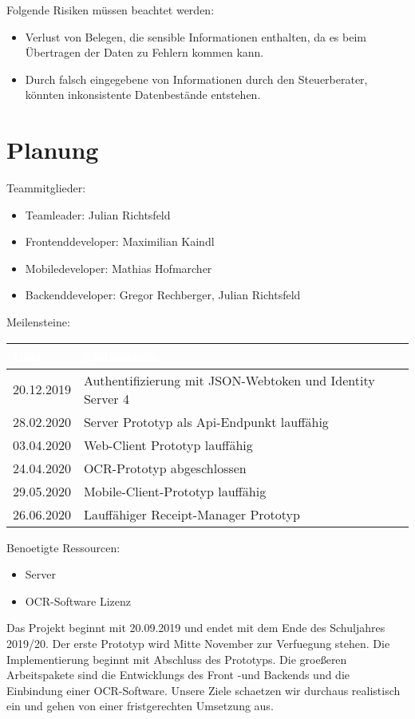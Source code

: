 \documentclass[12pt]{article}
\theoremstyle{definition}
\begin{document}
\begin{itemize}
\end{itemize}
Folgende Risiken müssen beachtet werden:

\begin{itemize}
\item Verlust von Belegen, die sensible Informationen enthalten, da es beim Übertragen der Daten zu Fehlern kommen kann.
\item Durch falsch eingegebene von Informationen durch den Steuerberater, könnten inkonsistente Datenbestände entstehen.
\end{itemize}

\pagebreak
\section{Planung}
Teammitglieder:
\begin{itemize}
\item Teamleader: Julian Richtsfeld
\item Frontenddeveloper: Maximilian Kaindl
\item Mobiledeveloper: Mathias Hofmarcher
\item Backenddeveloper: Gregor Rechberger, Julian Richtsfeld \hfill
\end{itemize}
Meilensteine:
\begin{itemize}
\end{itemize}
\begin{tabular}{|l|l|l|}
	\hline
	\cellcolor[gray]{0.5}\textcolor{white}{Date} & \cellcolor[gray]{0.5}\textcolor{white}{Meilenstein} \\ \hline
	20.12.2019&Authentifizierung mit JSON-Webtoken und Identity Server 4\\ \hline
	28.02.2020&Server Prototyp als Api-Endpunkt lauffähig \\ \hline
	03.04.2020&Web-Client Prototyp lauffähig \\ \hline
	24.04.2020&OCR-Prototyp abgeschlossen \\ \hline
	29.05.2020&Mobile-Client-Prototyp lauffähig\\ \hline
	26.06.2020&Lauffähiger Receipt-Manager Prototyp\\ \hline
\end{tabular}

\begin{itemize}
\end{itemize}

Benoetigte Ressourcen:
\begin{itemize}
\item Server
\item OCR-Software Lizenz
\end{itemize}
Das Projekt beginnt mit 20.09.2019 und endet mit dem Ende des Schuljahres 2019/20. Der erste Prototyp wird Mitte November zur Verfuegung stehen. Die Implementierung beginnt mit Abschluss des Prototyps. Die groeßeren Arbeitspakete sind die Entwicklungs des Front -und Backends und die Einbindung einer OCR-Software. Unsere Ziele schaetzen wir durchaus realistisch ein und gehen von einer fristgerechten Umsetzung aus.
\end{document}
